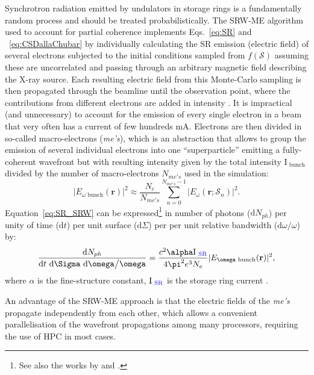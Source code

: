 \documentclass{iucr}              %
\newcommand{\inblue}[1]{{\color{blue}#1}}
\begin{document}
Synchrotron radiation emitted by undulators in storage rings is a fundamentally random process and should be treated probabilistically. The SRW-ME algorithm used to account for partial coherence implements Eqs.~\ref{eq:SR} \inblue{and ~\ref{eq:CSDallaChubar}} by individually calculating the SR emission \inblue{(electric field)} of several electrons subjected to the initial conditions sampled from $f(\mathcal{S})$ assuming these are uncorrelated and passing through an arbitrary magnetic field describing the X-ray source. Each resulting electric field from this Monte-Carlo sampling is then propagated through the beamline until the observation point, where the contributions from different electrons are added in intensity \cite{codeSRW_ME}. It is impractical (and unnecessary) to account for the emission of every single electron in a beam that very often has a current of few hundreds mA. Electrons are then divided in so-called macro-electrons (\textit{me's}), which is an abstraction that allows to group the emission of several individual electrons into one ``superparticle'' emitting a fully-coherent wavefront but with resulting intensity given by the total intensity $\text{I}_\text{~bunch}$ divided by the number of macro-electrons $N_{me's}$ used in the simulation:
\begin{equation}
|E_{\omega\text{~bunch}}(\textbf{r})|^2 \approx \frac{N_e}{N_{me's}}\sum_{n=0}^{N_{me's} - 1}\big| E_\omega(\textbf{r};\mathcal{S}_n)\big|^2.
\label{eq:SR_SRW}
\end{equation}
Equation~\ref{eq:SR_SRW} can be expressed\footnote{See also the works by  and .} in number of photons ($\text{d}N_{ph}$) per unity of time ($\text{d}t$) per unit surface ($\text{d}\Sigma$) per per unit relative bandwidth ($\text{d}\omega\big/\omega$) by:
\begin{equation}
\frac{\text{d}N_{ph}}{\text{d}t~\text{d}\Sigma~\text{d}\omega\big/\omega}=\frac{c^2\alpha \text{I}_\text{~\inblue{SR}}}{4\pi^2e^3N_e}|E_{\omega\text{~bunch}}(\textbf{r})|^2,
\label{eq:SR_ph}
\end{equation}
where $\alpha$ is the fine-structure constant, $\text{I}_\text{~\inblue{SR}}$ is the storage ring current \cite{Chubar1995}.

An advantage of the SRW-ME approach is that the electric fields of the \textit{me's} propagate independently from each other, which allows a convenient parallelisation of the wavefront propagations among many processors, requiring the use of HPC in most cases.
\end{document}
